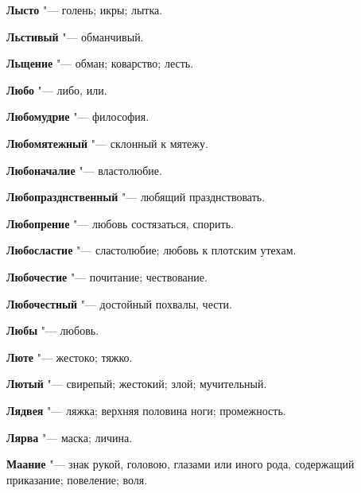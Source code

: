 \begin{mymulticols}{2}
\noindent\textbf{Лысто} "--- голень; икры; лытка. 




\noindent\textbf{Льстивый} "--- обманчивый. 




\noindent\textbf{Льщение} "--- обман; коварство; лесть. 




\noindent\textbf{Любо} "--- либо, или. 




\noindent\textbf{Любомудрие} "--- философия. 




\noindent\textbf{Любомятежный} "--- склонный к мятежу. 




\noindent\textbf{Любоначалие} "--- властолюбие. 




\noindent\textbf{Любопразднственный} "--- любящий празднствовать. 




\noindent\textbf{Любопрение} "--- любовь состязаться, спорить. 




\noindent\textbf{Любосластие} "--- сластолюбие; любовь к плотским утехам. 




\noindent\textbf{Любочестие} "--- почитание; чествование. 




\noindent\textbf{Любочестный} "--- достойный похвалы, чести. 




\noindent\textbf{Любы} "--- любовь. 




\noindent\textbf{Люте} "--- жестоко; тяжко. 




\noindent\textbf{Лютый} "--- свирепый; жестокий; злой; мучительный. 




\noindent\textbf{Лядвея} "--- ляжка; верхняя половина ноги; промежность. 




\noindent\textbf{Лярва} "--- маска; личина. 




\bukvaending






\noindent\textbf{Маание} "--- знак рукой, головою, глазами или иного рода, содержащий приказание; повеление; воля. 





\end{mymulticols}
